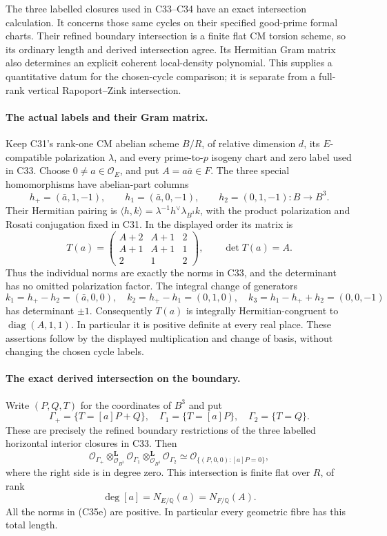 \documentclass[11pt]{article}
\newcommand{\Q}{\mathbb Q}\newcommand{\C}{\mathbb C}\newcommand{\Z}{\mathbb Z}\newcommand{\R}{\mathbb R}\newcommand{\A}{\mathbb A}\newcommand{\OO}{\mathcal O}
\theoremstyle{definition}\newtheorem{definition}[theorem]{Definition}\newtheorem{remark}[theorem]{Remark}
\begin{document}
The three labelled closures used in C33--C34 have an exact
intersection calculation. It concerns those same cycles on their
specified good-prime formal charts. Their refined boundary
intersection is a finite flat CM torsion scheme, so its ordinary
length and derived intersection agree. Its Hermitian Gram matrix
also determines an explicit coherent local-density polynomial.
This supplies a quantitative datum for the chosen-cycle comparison;
it is separate from a full-rank vertical Rapoport--Zink intersection.

\paragraph{The actual labels and their Gram matrix.}
Keep C31's rank-one CM abelian scheme $B/R$, of relative dimension
$d$, its $E$-compatible polarization $\lambda$, and every
prime-to-$p$ isogeny chart and zero label used in C33. Choose
$0\ne a\in\mathcal O_E$, and put $A=a\bar a\in F$.
The three special homomorphisms have abelian-part columns
\[
 h_+=(\bar a,1,-1),\qquad
 h_1=(\bar a,0,-1),\qquad
 h_2=(0,1,-1):B\longrightarrow B^3.
 \tag{C35a}
\]
Their Hermitian pairing is $\langle h,k\rangle=
\lambda^{-1}h^\vee\lambda_{B^3}k$, with the product
polarization and Rosati conjugation fixed in C31.
In the displayed order its matrix is
\[
 T(a)=
 \begin{pmatrix}
 A+2&A+1&2\\
 A+1&A+1&1\\
 2&1&2
 \end{pmatrix},\qquad \det T(a)=A.
 \tag{C35b}
\]
Thus the individual norms are exactly the norms in C33,
and the determinant has no omitted polarization factor.
The integral change of generators
\[
 k_1=h_+-h_2=(\bar a,0,0),\quad
 k_2=h_+-h_1=(0,1,0),\quad
 k_3=h_1-h_++h_2=(0,0,-1)
 \tag{C35c}
\]
has determinant $\pm1$. Consequently $T(a)$ is integrally
Hermitian-congruent to $\operatorname{diag}(A,1,1)$.
In particular it is positive definite at every real place.
These assertions follow by the displayed multiplication and
change of basis, without changing the chosen cycle labels.

\paragraph{The exact derived intersection on the boundary.}
Write $(P,Q,T)$ for the coordinates of $B^3$ and put
\[
 \Gamma_+=\{T=[a]P+Q\},\quad
 \Gamma_1=\{T=[a]P\},\quad
 \Gamma_2=\{T=Q\}.
\]
These are precisely the refined boundary restrictions of the
three labelled horizontal interior closures in C33. Then
\[
 \mathcal O_{\Gamma_+}
       \mathbin{\otimes}^{\mathbf L}_{\mathcal O_{B^3}}
 \mathcal O_{\Gamma_1}
       \mathbin{\otimes}^{\mathbf L}_{\mathcal O_{B^3}}
 \mathcal O_{\Gamma_2}
 \simeq \mathcal O_{\{(P,0,0):[a]P=0\}},
 \tag{C35d}
\]
where the right side is in degree zero. This intersection is
finite flat over $R$, of rank
\[
       \deg[a]=N_{E/\Q}(a)=N_{F/\Q}(A).
 \tag{C35e}
\]
All the norms in (C35e) are positive. In particular every
geometric fibre has this total length.
\end{document}
